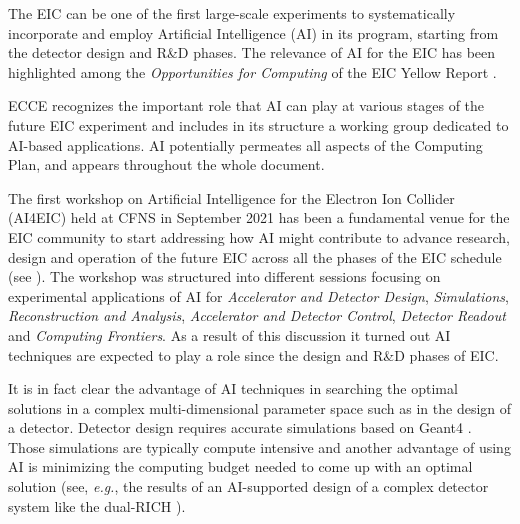 %
%
%

The EIC can be one of the first large-scale experiments to systematically incorporate and employ Artificial Intelligence (AI) in its program, starting from the detector design and R\&D phases. 
The relevance of AI for the EIC has been highlighted among the \textit{Opportunities for Computing} of the EIC Yellow Report \cite{eic_yellow_report_v1_1}.

ECCE recognizes the important role that AI can play at various stages of the future EIC experiment and includes in its structure a working group dedicated to AI-based applications. 
AI potentially permeates all aspects of the Computing Plan, and appears throughout the whole document.

The first workshop on Artificial Intelligence for the Electron Ion Collider (AI4EIC) held at CFNS in September 2021 \cite{AI4EIC_workshop} has been a fundamental venue for the EIC community to start addressing how AI might contribute to advance research, design and operation of the future EIC across all the phases of the EIC schedule (see \cite{AI4EIC_future}).
The workshop was structured into different sessions focusing on experimental applications of AI for \textit{Accelerator and Detector Design}, \textit{Simulations}, \textit{Reconstruction and Analysis}, \textit{Accelerator and Detector Control}, \textit{Detector Readout} and \textit{Computing Frontiers}. 
%
As a result of this discussion it turned out AI techniques are expected to play a role since the design and R\&D phases of EIC. 

It is in fact clear the advantage of AI techniques in searching the optimal solutions in a complex multi-dimensional parameter space such as in the design of a detector. Detector design requires accurate simulations based on Geant4 \cite{ALLISON2016186}. Those simulations are typically compute intensive and another advantage of using AI is minimizing the computing budget needed to come up with an optimal solution (see, \textit{e.g.}, the results of an AI-supported design of a complex detector system like the dual-RICH \cite{cisbani2020ai}).


